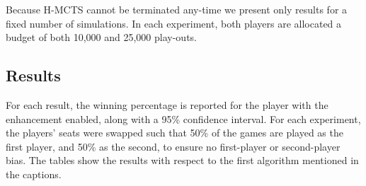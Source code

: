 \documentclass[a4paper]{llncs}
\begin{document}
Because H-MCTS cannot be terminated any-time we present only results for a fixed number of simulations. In each experiment, both players are allocated a budget of both 10,000 and 25,000 play-outs.

\subsection{Results}
\label{subsec:results}

For each result, the winning percentage is reported for the player with the enhancement enabled, along with a 95\% confidence interval. For each experiment, the players' seats were swapped such that 50\% of the games are played as the first player, and 50\% as the second, to ensure no first-player or second-player bias. The tables show the results with respect to the first algorithm mentioned in the captions.
\begin{table}[ht]
\centering
\tabcolsep=0.3cm
\vspace{4mm}
{\caption{H-MCTS vs. UCT with random play-outs, 1,000 games} \label{tab:uct_hmcts}}
\end{table}
\end{document}
